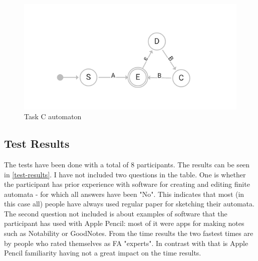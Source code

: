 \begin{figure}
    \includegraphics[width=\textwidth]{epsilon_automaton}
    \caption{Task C automaton}\label{task-c-automaton}
\end{figure}

\subsection{Test Results}

The tests have been done with a total of 8 participants. The results can be seen in \ref{test-results}. I have not included two questions in the table. One is whether the participant has prior experience with software for creating and editing finite automata - for which all answers have been "No". This indicates that most (in this case all) people have always used regular paper for sketching their automata. The second question not included is about examples of software that the participant has used with Apple Pencil: most of it were apps for making notes such as Notability or GoodNotes. From the time results the two fastest times are by people who rated themselves as FA "experts". In contrast with that is Apple Pencil familiarity having not a great impact on the time results. 

